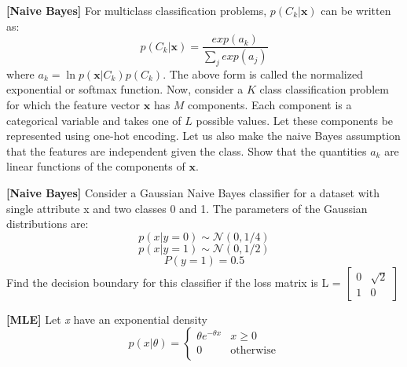 \documentclass[addpoints,12pt,solution]{exam}
\begin{document}
\begin{questions}
\begin{parts}
\end{parts}


\question[2] \textbf{[Naive Bayes]} For multiclass classification problems, $p(C_k | \mathbf{x})$ can be written as:
\begin{equation*}
    p(C_k | \mathbf{x}) = \frac{exp(a_k)}{\sum_j exp(a_j)}
\end{equation*}
where $a_k = \ln p(\mathbf{x}|C_k) p(C_k)$. The above form is called the normalized exponential or softmax function. Now, consider a $K$ class classification problem for which the feature vector $\mathbf{x}$ has $M$ components. Each component is a categorical variable and takes one of $L$ possible values. Let these components be represented using one-hot encoding. Let us also make the naive Bayes assumption that the features are independent given the class. Show that the quantities $a_k$ are linear functions of the components of $\mathbf{x}$.

\begin{solution}

\end{solution}


\question[2] \textbf{[Naive Bayes]} Consider a Gaussian Naive Bayes classifier for a dataset with single attribute x and two classes 0 and 1. The parameters of the Gaussian distributions are:
\begin{equation*}
p(x|y=0) \sim \mathcal{N}(0, 1/4)
\end{equation*}
\begin{equation*}
p(x|y=1) \sim \mathcal{N}(0, 1/2)
\end{equation*}
\begin{equation*}
P(y = 1) = 0.5
\end{equation*}
Find the decision boundary for this classifier if the loss matrix is
L = 
$ \begin{bmatrix}
0 & \sqrt{2} \\
1 & 0 
\end{bmatrix}
$

\begin{solution}

\end{solution}


\question \textbf{[MLE]} Let \textit{x} have an exponential density
\[ 
p(x|\theta) = \begin{cases} 
      \theta e^{-\theta x} & x \geq 0\\
      0 & \text{otherwise} \\
   \end{cases}
\]


\end{questions}
\end{document}

